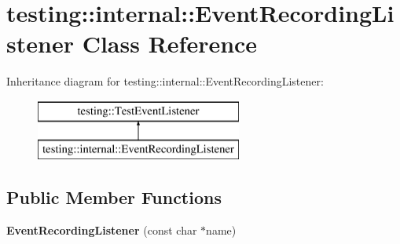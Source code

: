 \hypertarget{classtesting_1_1internal_1_1_event_recording_listener}{}\section{testing\+:\+:internal\+:\+:Event\+Recording\+Listener Class Reference}
\label{classtesting_1_1internal_1_1_event_recording_listener}
Inheritance diagram for testing\+:\+:internal\+:\+:Event\+Recording\+Listener\+:\begin{figure}[H]
\begin{center}
\leavevmode
\includegraphics[height=2.000000cm]{classtesting_1_1internal_1_1_event_recording_listener}
\end{center}
\end{figure}
\subsection*{Public Member Functions}
\begin{DoxyCompactItemize}
\item 
\mbox{\label{classtesting_1_1internal_1_1_event_recording_listener_a7b0254c15d6b8468e1441ee572fee707}} 
{\bfseries Event\+Recording\+Listener} (const char $\ast$name)
\end{DoxyCompactItemize}
